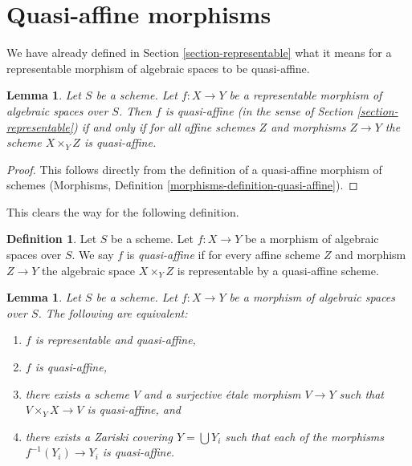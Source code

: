 \documentclass{stacks-project}
\theoremstyle{plain}
\newtheorem{lemma}[subsection]{Lemma}
\theoremstyle{definition}
\newtheorem{definition}[subsection]{Definition}
\theoremstyle{remark}
\numberwithin{equation}{subsection}
\begin{document}
\section{Quasi-affine morphisms}
\label{section-quasi-affine}

\noindent
We have already defined in Section \ref{section-representable}
what it means for a representable morphism of algebraic spaces
to be quasi-affine.

\begin{lemma}
\label{lemma-quasi-affine-representable}
Let $S$ be a scheme. Let $f : X \to Y$ be a representable
morphism of algebraic spaces over $S$. Then
$f$ is quasi-affine (in the sense of Section \ref{section-representable})
if and only if for all affine schemes $Z$
and morphisms $Z \to Y$ the scheme $X \times_Y Z$ is quasi-affine.
\end{lemma}

\begin{proof}
This follows directly from the definition of a quasi-affine morphism
of schemes
(Morphisms, Definition \ref{morphisms-definition-quasi-affine}).
\end{proof}

\noindent
This clears the way for the following definition.

\begin{definition}
\label{definition-quasi-affine}
Let $S$ be a scheme.
Let $f : X \to Y$ be a morphism of algebraic spaces over $S$.
We say $f$ is {\it quasi-affine} if for every affine scheme $Z$ and
morphism $Z \to Y$ the algebraic space $X \times_Y Z$ is representable
by a quasi-affine scheme.
\end{definition}

\begin{lemma}
\label{lemma-quasi-affine-local}
Let $S$ be a scheme.
Let $f : X \to Y$ be a morphism of algebraic spaces over $S$.
The following are equivalent:
\begin{enumerate}
\item $f$ is representable and quasi-affine,
\item $f$ is quasi-affine,
\item there exists a scheme $V$ and a surjective \'etale morphism
$V \to Y$ such that $V \times_Y X \to V$ is quasi-affine, and
\item there exists a Zariski covering $Y = \bigcup Y_i$ such
that each of the morphisms $f^{-1}(Y_i) \to Y_i$ is quasi-affine.
\end{enumerate}
\end{lemma}
\end{document}
